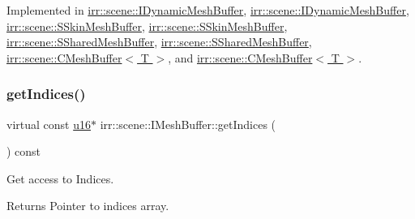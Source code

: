 Implemented in \hyperlink{classirr_1_1scene_1_1IDynamicMeshBuffer_a3ac73aed8c40103682c5c6388339e70d}{irr\+::scene\+::\+I\+Dynamic\+Mesh\+Buffer}, \hyperlink{classirr_1_1scene_1_1IDynamicMeshBuffer_a3ac73aed8c40103682c5c6388339e70d}{irr\+::scene\+::\+I\+Dynamic\+Mesh\+Buffer}, \hyperlink{structirr_1_1scene_1_1SSkinMeshBuffer_a0655e2196cb283a164580ada6c34aecf}{irr\+::scene\+::\+S\+Skin\+Mesh\+Buffer}, \hyperlink{structirr_1_1scene_1_1SSkinMeshBuffer_a0655e2196cb283a164580ada6c34aecf}{irr\+::scene\+::\+S\+Skin\+Mesh\+Buffer}, \hyperlink{structirr_1_1scene_1_1SSharedMeshBuffer_af9d02a1f61c5498cbe21be8185d1c803}{irr\+::scene\+::\+S\+Shared\+Mesh\+Buffer}, \hyperlink{structirr_1_1scene_1_1SSharedMeshBuffer_af9d02a1f61c5498cbe21be8185d1c803}{irr\+::scene\+::\+S\+Shared\+Mesh\+Buffer}, \hyperlink{classirr_1_1scene_1_1CMeshBuffer_aa183491690fa47b4697bbfcc7902301c}{irr\+::scene\+::\+C\+Mesh\+Buffer$<$ T $>$}, and \hyperlink{classirr_1_1scene_1_1CMeshBuffer_aa183491690fa47b4697bbfcc7902301c}{irr\+::scene\+::\+C\+Mesh\+Buffer$<$ T $>$}.

\mbox{\label{classirr_1_1scene_1_1IMeshBuffer_a76c0013378012af7aeb6cb8f4ea8f9a1}} 
\subsubsection{\texorpdfstring{get\+Indices()}{getIndices()}\hspace{0.1cm}{\footnotesize\ttfamily [1/4]}}
{\footnotesize\ttfamily virtual const \hyperlink{namespaceirr_ae9f8ec82692ad3b83c21f555bfa70bcc}{u16}$\ast$ irr\+::scene\+::\+I\+Mesh\+Buffer\+::get\+Indices (\begin{DoxyParamCaption}{ }\end{DoxyParamCaption}) const\hspace{0.3cm}{\ttfamily [pure virtual]}}



Get access to Indices. 

\begin{DoxyReturn}{Returns}
Pointer to indices array. 
\end{DoxyReturn}


